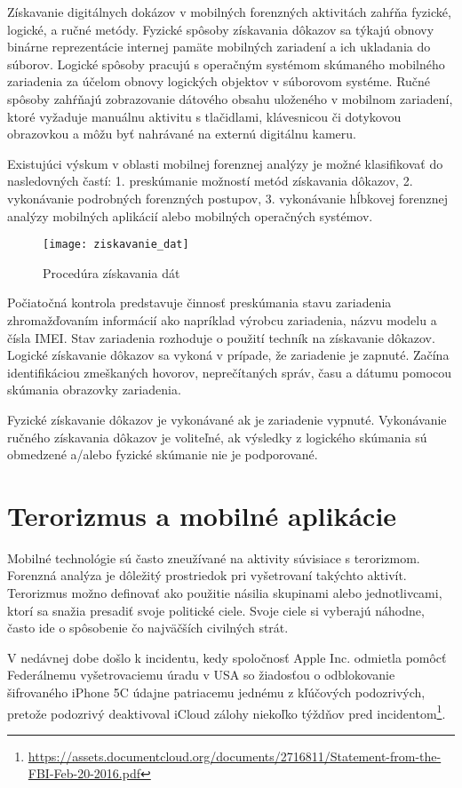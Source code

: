 Získavanie digitálnych dokázov v mobilných forenzných aktivitách zahŕňa fyzické, logické,
a ručné metódy. Fyzické spôsoby získavania dôkazov sa týkajú obnovy binárne reprezentácie internej pamäte mobilných zariadení
a ich ukladania do súborov. Logické spôsoby pracujú s operačným systémom skúmaného mobilného zariadenia za účelom obnovy logických objektov v súborovom systéme. Ručné spôsoby zahŕňajú zobrazovanie dátového obsahu uloženého v mobilnom zariadení, ktoré vyžaduje manuálnu aktivitu s tlačidlami, klávesnicou či dotykovou obrazovkou a môžu byť nahrávané na externú digitálnu kameru. 

Existujúci výskum v oblasti mobilnej forenznej analýzy je možné klasifikovať do nasledovných častí: 1. preskúmanie možností metód získavania dôkazov, 2. vykonávanie podrobných forenzných postupov, 3. vykonávanie hĺbkovej forenznej analýzy mobilných aplikácií alebo mobilných operačných systémov. 

\begin{figure}[h]
	\texttt{[image: ziskavanie\_dat]}
	\caption{Procedúra získavania dát}
\end{figure}


Počiatočná kontrola predstavuje činnosť preskúmania stavu zariadenia zhromažďovaním informácií ako napríklad výrobcu zariadenia, názvu modelu a čísla IMEI. Stav zariadenia rozhoduje o použití techník na získavanie dôkazov. Logické získavanie dôkazov sa vykoná v prípade, že zariadenie je zapnuté. Začína identifikáciou zmeškaných hovorov, neprečítaných správ, času a dátumu pomocou skúmania obrazovky zariadenia. 

Fyzické získavanie dôkazov je vykonávané ak je zariadenie vypnuté. Vykonávanie ručného získavania dôkazov je voliteľné, ak výsledky z logického skúmania sú obmedzené a/alebo fyzické skúmanie nie je podporované. 

\chapter{Terorizmus a mobilné aplikácie}
Mobilné technológie sú často zneužívané na aktivity súvisiace s terorizmom. Forenzná analýza je dôležitý prostriedok pri vyšetrovaní takýchto aktivít. Terorizmus možno definovať ako použitie násilia skupinami alebo jednotlivcami, ktorí sa snažia presadiť svoje politické ciele. Svoje ciele si vyberajú náhodne, často ide o spôsobenie čo najväčších civilných strát.

V nedávnej dobe došlo k incidentu, kedy spoločnosť Apple Inc. odmietla pomôcť Federálnemu vyšetrovaciemu úradu v USA so žiadosťou o odblokovanie šifrovaného iPhone 5C údajne
patriacemu jednému z kľúčových podozrivých, pretože podozrivý deaktivoval iCloud zálohy niekoľko týždňov pred incidentom\footnote{\url{https://assets.documentcloud.org/documents/2716811/Statement-from-the-FBI-Feb-20-2016.pdf}}.

